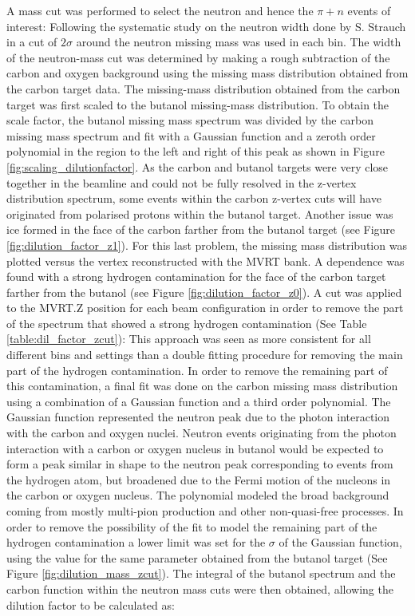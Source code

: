 A mass cut was performed to select the neutron and hence the $\pi + n$ events of interest: Following the systematic study on the neutron width done by S. Strauch in \cite{Strauch_2014} a cut of $2 \sigma$ around the neutron missing mass was used in each bin. The width of the neutron-mass cut was determined by making a rough subtraction of the carbon and oxygen background using the missing mass distribution obtained from the carbon target data. The missing-mass distribution obtained from the carbon target was first scaled to the butanol missing-mass distribution. To obtain the scale factor, the butanol missing mass spectrum was divided by the carbon missing mass spectrum and fit with a Gaussian function and a zeroth order polynomial in the region to the left and right of this peak as shown in Figure \ref{fig:scaling_dilutionfactor}. 
As the carbon and butanol targets were very close together in the beamline and could not be fully resolved in the z-vertex distribution spectrum, some events within the carbon z-vertex cuts will have originated from polarised protons within the butanol target. Another issue was ice formed in the face of the carbon farther from the butanol target (see Figure \ref{fig:dilution_factor_z1}). For this last problem, the missing mass distribution was plotted versus the vertex reconstructed with the MVRT bank. A dependence was found with a strong hydrogen contamination for the face of the carbon target farther from the butanol (see Figure \ref{fig:dilution_factor_z0}). A cut was applied to the MVRT.Z position for each beam configuration in order to remove the part of the spectrum that showed a strong hydrogen contamination (See Table \ref{table:dil_factor_zcut}): This approach was seen as more consistent for all different bins and settings than a double fitting procedure for removing the main part of the hydrogen contamination. In order to remove the remaining part of this contamination, a final fit was done on the carbon missing mass distribution using a combination of a Gaussian function and a third order polynomial. The Gaussian function represented the neutron peak due to the photon interaction with the carbon and oxygen nuclei. Neutron events originating from the photon interaction with a carbon or oxygen nucleus in butanol would be expected to form a peak similar in shape to the neutron peak corresponding to events from the hydrogen atom, but broadened due to the Fermi motion of the nucleons in the carbon or oxygen nucleus. The polynomial modeled the broad background coming from mostly multi-pion production and other non-quasi-free processes. In order to remove the possibility of the fit to model the remaining part of the hydrogen contamination a lower limit was set for the $\sigma$ of the Gaussian function, using the value for the same parameter obtained from the butanol target (See Figure \ref{fig:dilution_mass_zcut}). The integral of the butanol spectrum and the carbon function within the neutron mass cuts were then obtained, allowing the dilution factor to be calculated as:
